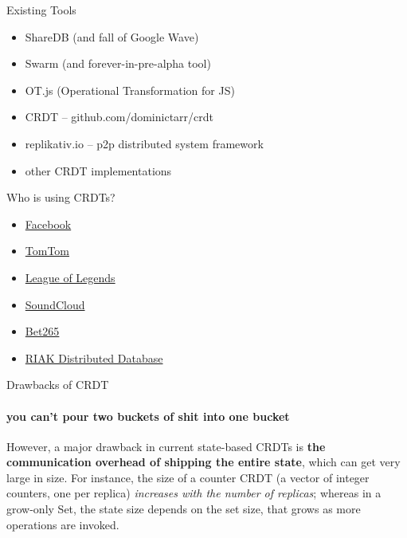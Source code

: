 \documentclass{beamer}
\begin{document}
\begin{frame}{Existing Tools}

\begin{itemize}
  \item ShareDB (and fall of Google Wave)
  \item Swarm (and forever-in-pre-alpha tool)
  \item OT.js (Operational Transformation for JS)
  \item CRDT – github.com/dominictarr/crdt
  \item replikativ.io – p2p distributed system framework
  \item other CRDT implementations
\end{itemize}

\end{frame}


\begin{frame}{Who is using CRDTs?}
\begin{itemize}
	\item \href{https://dzone.com/articles/facebook-announces-apollo-qcon}{Facebook}
	\item \href{https://speakerdeck.com/ajantis/practical-demystification-of-crdts}{TomTom}
	\item \href{http://highscalability.com/blog/2014/10/13/how-league-of-legends-scaled-chat-to-70-million-players-it-t.html}{League of Legends}
	\item \href{https://developers.soundcloud.com/blog/roshi-a-crdt-system-for-timestamped-events}{SoundCloud}
	\item \href{http://www.erlang-factory.com/static/upload/media/1434558446558020erlanguserconference2015bet365michaelowen.pdf}{Bet265}
	\item \href{http://docs.basho.com/riak/kv/2.2.3/developing/data-types/}{RIAK Distributed Database}
\end{itemize}
\end{frame}


\begin{frame}{Drawbacks of CRDT}
\framesubtitle{you can't pour two buckets of shit into one bucket}
However, a major drawback in current state-based CRDTs is \textbf{the communication overhead of shipping the entire state}, which can get very large in size. For instance, the size of a counter CRDT (a vector of integer counters, one per replica) \textit{increases with the number of replicas}; whereas in a grow-only Set, the state size depends on the set size, that grows as more operations are invoked.
\end{frame}
\end{document}
